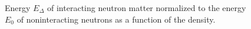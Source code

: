 \begin{figure}
  \begin{center}
    \leavevmode
    \parbox{0.9\textwidth}
           {}
  \end{center}
\protect\caption{Energy $E_\Delta$ of interacting neutron matter normalized to
the energy $E_0$ of noninteracting neutrons as a function of the density.}
\label{fig2}
\end{figure}








